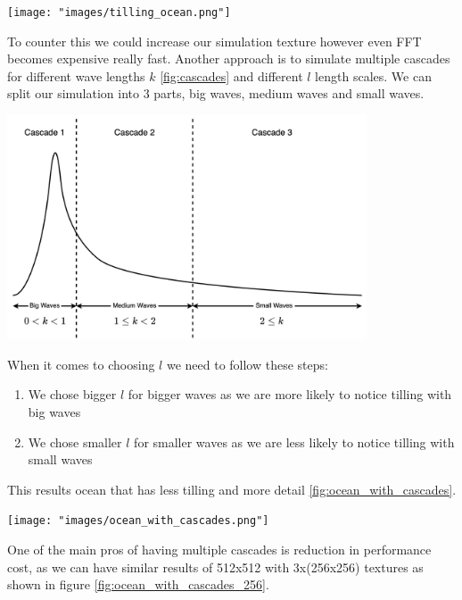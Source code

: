 \begin{minipage}{1\textwidth}
    \centering
    \texttt{[image: "images/tilling\_ocean.png"]}
    \label{fig:ocean_with_tilling}
\end{minipage}

To counter this we could increase our simulation texture however even FFT becomes expensive really fast.
Another approach is to simulate multiple cascades for different wave lengths $k$ \ref{fig:cascades} and different $l$ length scales. We can split our simulation into 3 parts, big waves, medium waves and small waves.

\begin{minipage}{1\textwidth}
    \centering
    \includegraphics[width=0.8\textwidth]{"images/cascades.png"}
    \label{fig:cascades}
\end{minipage}

When it comes to choosing $l$ we need to follow these steps:
\begin{enumerate}
    \item We chose bigger $l$ for bigger waves as we are more likely to notice tilling with big waves
    \item We chose smaller $l$ for smaller waves as we are less likely to notice tilling with small waves
\end{enumerate}
This results ocean that has less tilling and more detail \ref{fig:ocean_with_cascades}.

\begin{minipage}{1\textwidth}
    \centering
    \texttt{[image: "images/ocean\_with\_cascades.png"]}
    \label{fig:ocean_with_cascades}
\end{minipage}

One of the main pros of having multiple cascades is reduction in performance cost, as we can have similar results of 512x512 with 3x(256x256) textures as shown in figure \ref{fig:ocean_with_cascades_256}.

